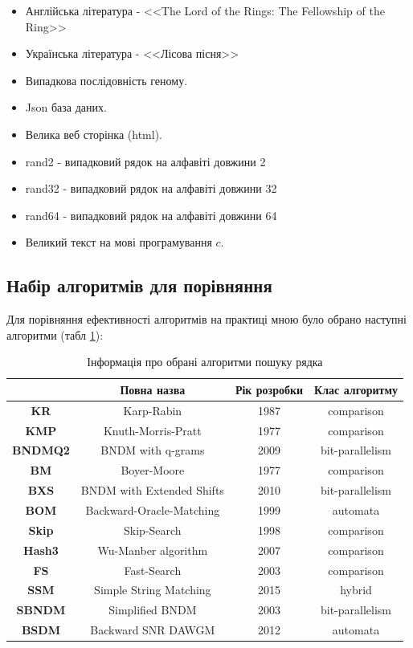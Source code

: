 \documentclass[a4paper,14pt]{extarticle} %
\begin{document}
	\begin{itemize}
		\item Англійська література - <<The Lord of the Rings: The Fellowship of the Ring>>
		\item Українська література - <<Лісова пісня>>
		\item Випадкова послідовність геному.
		\item Json база даних.
		\item Велика веб сторінка (html).
		\item rand2 - випадковий рядок на алфавіті довжини 2
		\item rand32 - випадковий рядок на алфавіті довжини 32
		\item rand64 - випадковий рядок на алфавіті довжини 64
		\item Великий текст на мові програмування $c$.
	\end{itemize}
	\subsection{Набір алгоритмів для порівняння} \label{section:algorithms_set}

	Для порівняння ефективності алгоритмів на практиці мною було обрано наступні алгоритми (табл \ref{table:string_algorithms}):

	\begin{table}[H]
		\centering
		\small
		\begin{tabular}{|c|c|c|c|}
			\hline
			& \textbf{Повна назва} & \textbf{Рік розробки} & \textbf{Клас алгоритму} \\ 
			\hline
			\textbf{KR} & Karp-Rabin & 1987 & comparison \\ 
			\hline
			\textbf{KMP} & Knuth-Morris-Pratt & 1977 & comparison \\ 
			\hline
			\textbf{BNDMQ2} & BNDM with q-grams & 2009 & bit-parallelism \\ 
			\hline
			\textbf{BM} & Boyer-Moore & 1977 & comparison \\ 
			\hline
			\textbf{BXS} & BNDM with Extended Shifts &  2010 & bit-parallelism \\ 
			\hline
			\textbf{BOM} &  Backward-Oracle-Matching & 1999 & automata \\ 
			\hline
			\textbf{Skip} & Skip-Search  & 1998 & comparison \\ 
			\hline
			\textbf{Hash3} & Wu-Manber algorithm	 & 2007 & comparison \\ 
			\hline
			\textbf{FS} & Fast-Search &  2003 & comparison \\ 
			\hline
			\textbf{SSM} & Simple String Matching & 2015 & hybrid \\ 
			\hline
			\textbf{SBNDM} & Simplified BNDM & 2003 & bit-parallelism \\ 
			\hline
			\textbf{BSDM} & Backward SNR DAWGM & 2012 & automata \\ 
			\hline
		\end{tabular}
		\caption{Інформація про обрані алгоритми пошуку рядка}
		\label{table:string_algorithms}
	\end{table}
\end{document}
